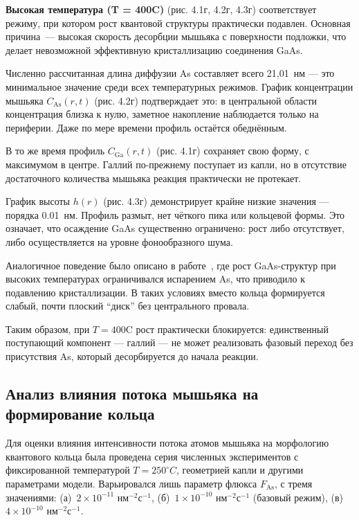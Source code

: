 \documentclass[14pt,oneside]{extarticle}
\begin{document}
\textbf{Высокая температура (T = 400\textdegree C)} (рис. 4.1г, 4.2г, 4.3г) соответствует режиму, при котором рост квантовой структуры практически подавлен. Основная причина~— высокая скорость десорбции мышьяка с поверхности подложки, что делает невозможной эффективную кристаллизацию соединения GaAs.

Численно рассчитанная длина диффузии As составляет всего 21{,}01~нм — это минимальное значение среди всех температурных режимов. График концентрации мышьяка $C_\mathrm{As}(r, t)$ (рис. 4.2г) подтверждает это: в центральной области концентрация близка к нулю, заметное накопление наблюдается только на периферии. Даже по мере времени профиль остаётся обеднённым.

В то же время профиль $C_\mathrm{Ga}(r, t)$ (рис. 4.1г) сохраняет свою форму, с максимумом в центре. Галлий по-прежнему поступает из капли, но в отсутствие достаточного количества мышьяка реакция практически не протекает.

График высоты $h(r)$ (рис. 4.3г) демонстрирует крайне низкие значения — порядка 0.01~нм. Профиль размыт, нет чёткого пика или кольцевой формы. Это означает, что осаждение GaAs существенно ограничено: рост либо отсутствует, либо осуществляется на уровне фонообразного шума.

Аналогичное поведение было описано в работе~\cite{fan2023evaporation}, где рост GaAs-структур при высоких температурах ограничивался испарением As, что приводило к подавлению кристаллизации. В таких условиях вместо кольца формируется слабый, почти плоский “диск” без центрального провала.

Таким образом, при $T = 400$\textdegree C рост практически блокируется: единственный поступающий компонент — галлий — не может реализовать фазовый переход без присутствия As, который десорбируется до начала реакции.

\subsection{Анализ влияния потока мышьяка на формирование кольца}

Для оценки влияния интенсивности потока атомов мышьяка на морфологию квантового кольца была проведена серия численных экспериментов с фиксированной температурой \(T = 250^\circ C\), геометрией капли и другими параметрами модели. Варьировался лишь параметр флюкса \( F_{\text{As}} \), с тремя значениями: (а)~\(2 \times 10^{-11}\) нм$^{-2}$с$^{-1}$, (б)~\(1 \times 10^{-10}\) нм$^{-2}$с$^{-1}$ (базовый режим), (в)~\(4 \times 10^{-10}\) нм$^{-2}$с$^{-1}$.
\end{document}

